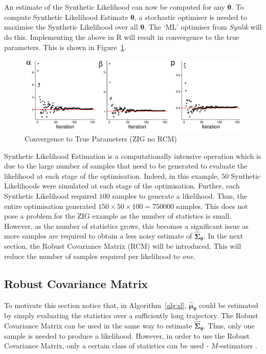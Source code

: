 An estimate of the Synthetic Likelihood can now be computed for any $\pmb{\theta}$. To compute Synthetic Likelihood Estimate $\hat{\pmb{\theta}}$, a stochastic optimiser is needed to maximise the Synthetic Likelihood over all $\pmb{\theta}$. The `ML' optimiser from \emph{Synlik} \citep{synlik_2014} will do this. Implementing the above in R will result in convergence to the true parameters. This is shown in Figure~\ref{fig:no_robust_zig}.

\begin{figure}[H]
    \centering
    \includegraphics[width=12cm]{images/sl/gamma_example/no_robust_optimisation.pdf}
    \caption{Convergence to True Parameters (ZIG no RCM)}
    \label{fig:no_robust_zig}
\end{figure}

Synthetic Likelihood Estimation is a computationally intensive operation which is due to the large number of samples that need to be generated to evaluate the likelihood at each stage of the optimisation. Indeed, in this example, $50$ Synthetic Likelihoods were simulated at each stage of the optimisation. Further, each Synthetic Likelihood required $100$ samples to generate a likelihood. Thus, the entire optimisation generated $150 \times 50 \times 100 = 750000$ samples. This does not pose a problem for the ZIG example as the number of statistics is small. However, as the number of statistics grows, this becomes a significant issue as more samples are required to obtain a less noisy estimate of $\hat{\pmb{\Sigma}}_{\pmb{\theta}}$. In the next section, the Robust Covariance Matrix (RCM) will be introduced. This will reduce the number of samples required per likelihood to \emph{one}.

\subsection{Robust Covariance Matrix}
\label{subsec:rcm}
To motivate this section notice that, in Algorithm~\ref{alg:sl}, $\hat{\pmb{\mu}}_{\pmb{\theta}}$ could be estimated by simply evaluating the statistics over a sufficiently long trajectory. The Robust Covariance Matrix can be used in the same way to estimate $\hat{\pmb{\Sigma}}_{\pmb{\theta}}$. Thus, only one sample is needed to produce a likelihood. However, in order to use the Robust Covariance Matrix, only a certain class of statistics can be used - $M$-estimators \citep{huber_1967}.

